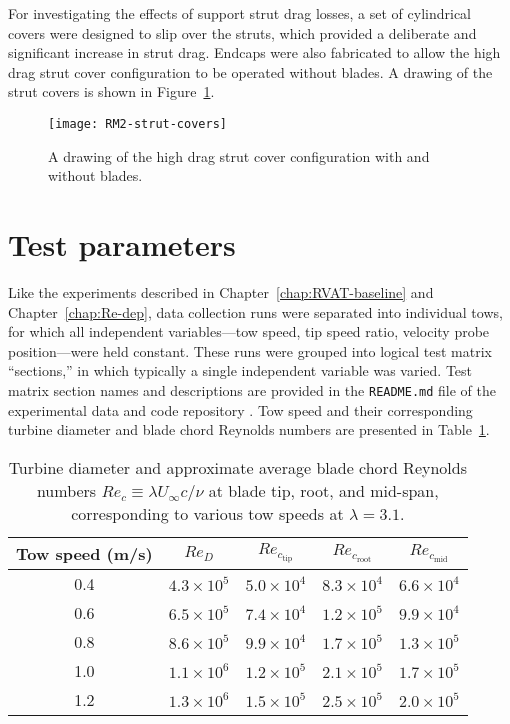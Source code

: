 For investigating the effects of support strut drag losses, a set of cylindrical
covers were designed to slip over the struts, which provided a deliberate and
significant increase in strut drag. Endcaps were also fabricated to allow the
high drag strut cover configuration to be operated without blades. A drawing of
the strut covers is shown in Figure~\ref{fig:covers}.

\begin{figure}
    \centering

    \texttt{[image: RM2-strut-covers]}
    
    \caption{A drawing of the high drag strut cover configuration with and
        without blades.}
    
    \label{fig:covers}
\end{figure}


\section{Test parameters}

Like the experiments described in Chapter~\ref{chap:RVAT-baseline} and
Chapter~\ref{chap:Re-dep}, data collection runs were separated into individual
tows, for which all independent variables---tow speed, tip speed ratio, velocity
probe position---were held constant. These runs were grouped into logical test
matrix ``sections,'' in which typically a single independent variable was
varied. Test matrix section names and descriptions are provided in the
\texttt{README.md} file of the experimental data and code repository
\cite{Bachant2016-RM2-data}. Tow speed and their corresponding turbine diameter
and blade chord Reynolds numbers are presented in Table~\ref{tab:re}.

\begin{table}
    \centering
    \begin{tabular}{c|c|c|c|c}
        Tow speed (m/s) & $Re_D$ & $Re_{c_\mathrm{tip}}$ & $Re_{c_\mathrm{root}}$ & $Re_{c_\mathrm{mid}}$\\
        \hline
        0.4 & $4.3 \times 10^5$ & $5.0 \times 10^4$ & $8.3 \times 10^4$ & $6.6 \times 10^4$ \\
        0.6 & $6.5 \times 10^5$ & $7.4 \times 10^4$ & $1.2 \times 10^5$ & $9.9 \times 10^4$ \\
        0.8 & $8.6 \times 10^5$ & $9.9 \times 10^4$ & $1.7 \times 10^5$ & $1.3 \times 10^5$ \\
        1.0 & $1.1 \times 10^6$ & $1.2 \times 10^5$ & $2.1 \times 10^5$ & $1.7 \times 10^5$ \\
        1.2 & $1.3 \times 10^6$ & $1.5 \times 10^5$ & $2.5 \times 10^5$ & $2.0 \times 10^5$ \\
    \end{tabular}
    
    \caption{Turbine diameter and approximate average blade chord Reynolds
        numbers $Re_c \equiv \lambda U_\infty c / \nu$ at blade tip, root, and
        mid-span, corresponding to various tow speeds at $\lambda=3.1$.}
    
    \label{tab:re}
\end{table}

